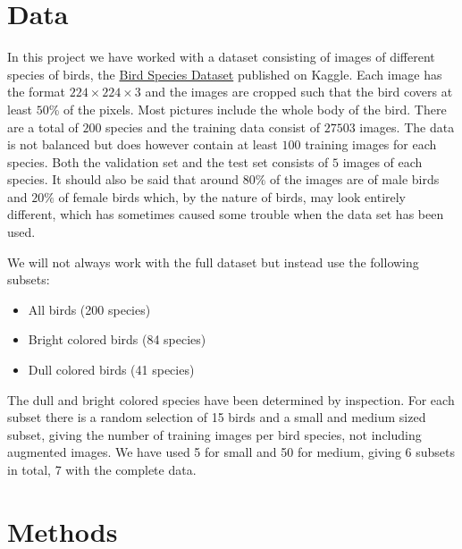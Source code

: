 \documentclass{article}
\begin{document}
\section{Data}

In this project we have worked with a dataset consisting of images of different species of birds, the  
\href{https://www.kaggle.com/gpiosenka/100-bird-species}{Bird Species Dataset} published on Kaggle. Each image has the format $224 \times 224 \times 3$ and the images are cropped such that the bird covers at least $50$\% of the pixels. Most pictures include the whole body of the bird.
There are 
a total of $200$ species and the training data consist of $27503$ images. The data is not balanced but does however contain at least $100$ training images for each species. 
Both the validation set and the test set consists of $5$ images of each species. 
It should also be said that around $80\%$ of the images are of male birds and $20\%$ of female 
birds which, by the nature of birds, may look entirely different, which has sometimes caused some trouble when the data set has been used.

We will not always work with the full dataset but instead use the following subsets:

\begin{itemize}
	\item All birds (200 species)
	\item Bright colored birds (84 species)
	\item Dull colored birds (41 species)
\end{itemize}

The dull and bright colored species have been determined by inspection. For each subset there is a random selection of 15 birds and a small and medium sized subset, giving the number of training images per bird species, not including augmented images. We have used 5 for small and 50 for medium, giving 6 subsets in total, 7 with the complete data.


\section{Methods}

\end{document}
